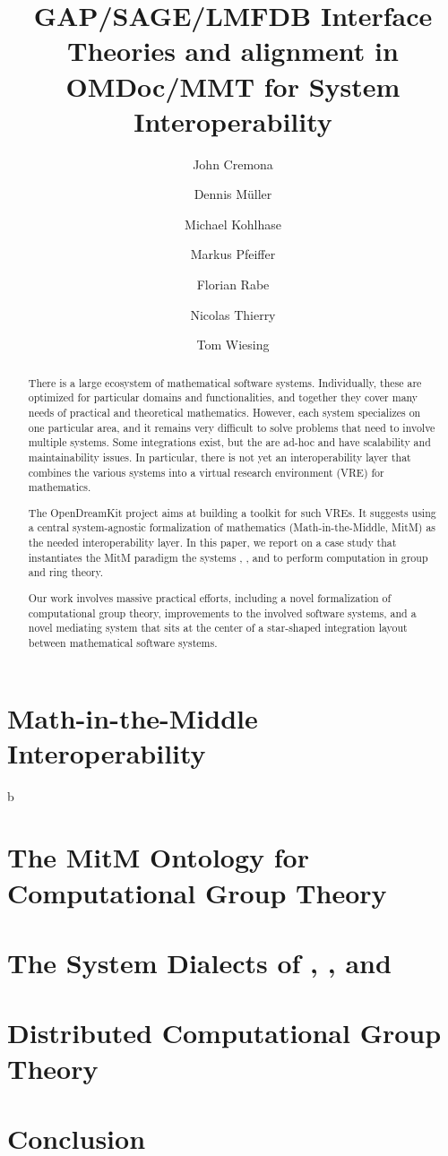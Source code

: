 \documentclass[book]{deliverablereport}
\title{GAP/SAGE/LMFDB Interface Theories and alignment in OMDoc/MMT for System Interoperability}
\author{John Cremona}
\author{Dennis M\"uller}
\author{Michael Kohlhase}
\author{Markus Pfeiffer}
\author{Florian Rabe}
\author{Nicolas Thierry}
\author{Tom Wiesing}
\begin{document}
\begin{abstract}
  There is a large ecosystem of mathematical software systems.  Individually, these are
  optimized for particular domains and functionalities, and together they cover many needs
  of practical and theoretical mathematics.  However, each system specializes on one
  particular area, and it remains very difficult to solve problems that need to involve
  multiple systems.  Some integrations exist, but the are ad-hoc and have scalability and
  maintainability issues.  In particular, there is not yet an interoperability layer that
  combines the various systems into a virtual research environment (VRE) for mathematics.
  
  The OpenDreamKit project aims at building a toolkit for such VREs.  It suggests using a
  central system-agnostic formalization of mathematics (Math-in-the-Middle, MitM) as the
  needed interoperability layer.  In this paper, we report on a case study that
  instantiates the MitM paradigm the systems \GAP, \Sage, and \Singular to perform
  computation in group and ring theory.
 
  Our work involves massive practical efforts, including a novel formalization of
  computational group theory, improvements to the involved software systems, and a novel
  mediating system that sits at the center of a star-shaped integration layout between
  mathematical software systems.
\end{abstract}

\maketitle
\newpage\tableofcontents\newpage
{}



\section{Math-in-the-Middle Interoperability}\label{sec:mitm}
b

\section{The MitM Ontology for Computational Group Theory}\label{sec:cgt}


\section{The System Dialects of \GAP, \Sage, and \Singular}\label{sec:apit}


\section{Distributed Computational Group Theory}\label{sec:case}


\section{Conclusion}\label{sec:concl}

\end{document}
